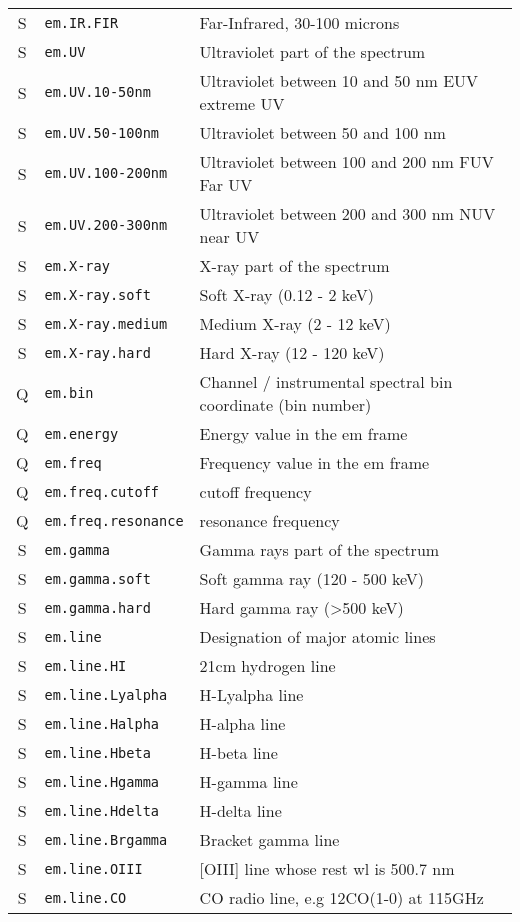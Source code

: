 \documentclass[11pt,a4paper]{ivoa}
\begin{document}
\begin{longtable}[h!]{c|p{40ex}|p{}}
S & {\tt em.IR.FIR} & Far-Infrared, 30-100 microns\\
S & {\tt em.UV} & Ultraviolet part of the spectrum\\
S & {\tt em.UV.10-50nm} & Ultraviolet between 10 and 50 nm EUV extreme UV\\
S & {\tt em.UV.50-100nm} & Ultraviolet between 50 and 100 nm\\
S & {\tt em.UV.100-200nm} & Ultraviolet between 100 and 200 nm FUV Far UV\\
S & {\tt em.UV.200-300nm} & Ultraviolet between 200 and 300 nm NUV near UV\\
S & {\tt em.X-ray} & X-ray part of the spectrum\\
S & {\tt em.X-ray.soft} & Soft X-ray (0.12 - 2 keV)\\
S & {\tt em.X-ray.medium} & Medium X-ray (2 - 12 keV)\\
S & {\tt em.X-ray.hard} & Hard X-ray (12 - 120 keV)\\
Q & {\tt em.bin} & Channel / instrumental spectral bin coordinate (bin number)\\
Q & {\tt em.energy} & Energy value in the em frame\\
Q & {\tt em.freq} & Frequency value in the em frame\\
Q & {\tt em.freq.cutoff} & cutoff frequency\\
Q & {\tt em.freq.resonance} & resonance frequency\\
S & {\tt em.gamma} & Gamma rays part of the spectrum\\
S & {\tt em.gamma.soft} & Soft gamma ray (120 - 500 keV)\\
S & {\tt em.gamma.hard} & Hard gamma ray (>500 keV)\\
S & {\tt em.line} & Designation of major atomic lines\\
S & {\tt em.line.HI} & 21cm hydrogen line\\
S & {\tt em.line.Lyalpha} & H-Lyalpha line\\
S & {\tt em.line.Halpha} & H-alpha line\\
S & {\tt em.line.Hbeta} & H-beta line\\
S & {\tt em.line.Hgamma} & H-gamma line\\
S & {\tt em.line.Hdelta} & H-delta line\\
S & {\tt em.line.Brgamma} & Bracket gamma line\\
S & {\tt em.line.OIII} & [OIII] line whose rest wl is 500.7 nm\\
S & {\tt em.line.CO} & CO radio line,  e.g 12CO(1-0) at 115GHz\\

\end{longtable}
\end{document}
